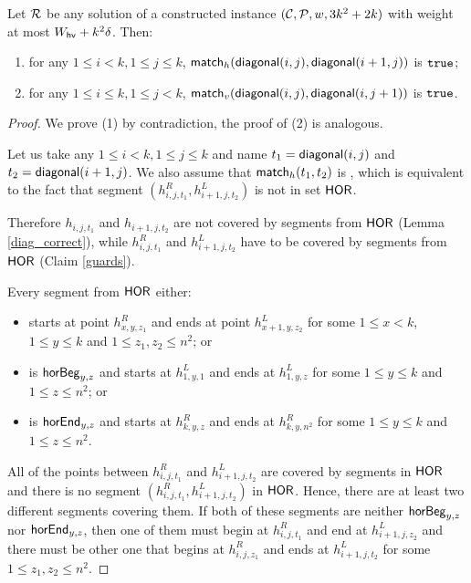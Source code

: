 \begin{lemma}
\label{vertical_horizontal_synchronized}
Let $\mathcal{R}$ be any solution
of a constructed instance $(\mathcal{C}, \mathcal{P}, w, 3k^2+2k)$
with weight at most $W_{\mathsf{hv}}+k^2\delta$. Then:
\begin{enumerate}
\item 
for any $1 \le i < k, 1 \le j \le k$,
$\mathsf{match}_h(\mathsf{diagonal}(i, j),\mathsf{diagonal}(i+1, j))$ is $\texttt{true}$;
\item 
for any $1 \le i \le k, 1 \le j < k$,
$\mathsf{match}_v(\mathsf{diagonal}(i, j),\mathsf{diagonal}(i, j+1))$ is $\texttt{true}$.
\end{enumerate}
\end{lemma}

\begin{proof}
We prove (1) by contradiction, the proof of (2) is analogous.

Let us take any $1 \le i < k, 1 \le j \le k$
and name $t_1 = \mathsf{diagonal}(i, j)$ and $t_2 = \mathsf{diagonal}(i+1, j)$.
We also assume that $\mathsf{match}_h(t_1,t_2)$ is \false,
which is equivalent to the fact that
segment $(h_{i,j,t_1}^R, h_{i+1,j,t_2}^L)$
is not in set $\mathsf{HOR}$.

Therefore $h_{i,j,t_1}$ and $h_{i+1,j,t_2}$
are not covered by segments from $\mathsf{HOR}$ (Lemma \ref{diag_correct}),
while $h^R_{i,j,t_1}$ and $h^L_{i+1,j,t_2}$
have to be covered by segments from $\mathsf{HOR}$ (Claim \ref{guards}).


Every segment from $\mathsf{HOR}$ either:
\begin{itemize}
\item starts at point $h^R_{x,y,z_1}$
and ends at point $h^L_{x+1,y,z_2}$ for some
$1 \le x < k$,$1 \le y \le k$ and $1 \le z_1, z_2 \le n^2$; or
\item is $\mathsf{horBeg}_{y,z}$ 
and starts at $h^L_{1,y,1}$ and ends at $h^L_{1,y,z}$ for some $1 \le y \le k$ and $1 \le z \le n^2$; or
\item is $\mathsf{horEnd}_{y,z}$
and starts at $h^R_{k,y,z}$ and ends at $h^R_{k,y,n^2}$ for some $1 \le y \le k$ and $1 \le z \le n^2$.
\end{itemize}
All of the points between $h^R_{i,j,t_1}$ and $h^L_{i+1,j,t_2}$
are covered by segments in $\mathsf{HOR}$ 
and there is no segment $(h^R_{i,j,t_1}, h^L_{i+1,j,t_2})$ in $\mathsf{HOR}$.
Hence, there are at least two different segments covering them.
If both of these segments are neither $\mathsf{horBeg}_{y,z}$ nor $\mathsf{horEnd}_{y,z}$,
then one of them must begin
at $h^R_{i,j,t_1}$ and end at $h^L_{i+1,j,z_2}$
and there must be other one that begins at $h^R_{i,j,z_1}$
and ends at $h^L_{i+1,j,t_2}$
for some $1 \le z_1, z_2 \le n^2$.


\end{proof}
